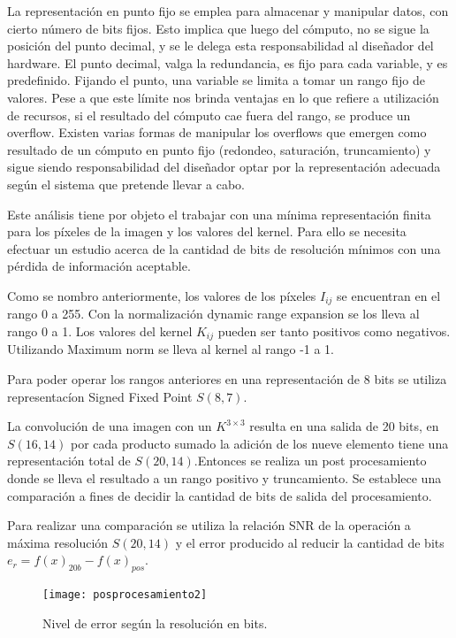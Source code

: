 La representación en punto fijo se emplea para
almacenar y manipular datos, con cierto número de bits fijos. Esto implica que
luego del cómputo, no se sigue la posición del punto decimal, y se le delega
esta responsabilidad al diseñador del hardware. El punto decimal, valga la
redundancia, es fijo para cada variable, y es predefinido. Fijando el punto, una
variable se limita a tomar un rango fijo de valores. Pese a que este límite nos
brinda ventajas en lo que refiere a utilización de recursos, si el resultado del
cómputo cae fuera del rango, se produce un overflow. Existen varias formas de
manipular los overflows que emergen como resultado de un cómputo en punto fijo
(redondeo, saturación, truncamiento) y sigue siendo responsabilidad del
diseñador optar por la representación adecuada según el sistema que pretende
llevar a cabo.

Este an\'alisis tiene por objeto el trabajar con una m\'inima representaci\'on
finita para los p\'ixeles de la imagen y los valores del kernel.
Para ello se necesita efectuar un estudio acerca de la cantidad de bits de
resoluci\'on m\'inimos  con una p\'erdida de informaci\'on aceptable.

Como se nombro anteriormente, los valores de los p\'ixeles \(I_{ij}\) se
encuentran en el rango 0 a 255. Con la normalización dynamic range
expansion se los lleva al rango 0 a 1. Los valores del kernel
\(K_{ij}\) pueden ser tanto positivos como negativos. Utilizando Maximum
norm se lleva al kernel al rango -1 a 1.

Para poder operar los rangos anteriores en una representaci\'on de 8 bits se
utiliza representac\'ion Signed Fixed Point\cite{fix_p} \(S(8,7)\). 

La convoluci\'on de una imagen con un $K^{3{\times}3}$ resulta en una 
salida de 20 bits, en \(S(16,14)\) por cada producto sumado la adici\'on de los nueve
elemento tiene una representaci\'on total de \(S(20,14)\).Entonces se realiza un
post procesamiento donde se lleva el resultado a un rango positivo y truncamiento.
Se establece una comparaci\'on a fines de decidir la cantidad de bits de salida del
procesamiento.

Para realizar una comparaci\'on se utiliza la relaci\'on SNR de la operaci\'on a
m\'axima resoluci\'on \(S(20,14)\) y el error producido al reducir la cantidad
de bits ${e_r=f(x)_{20b}-f(x)_{pos}}$\cite{srntesis}.

\begin{figure}
\centering
\texttt{[image: posprocesamiento2]}
\caption{Nivel de error según la resolución en bits.}
\label{prepro}
\end{figure}

